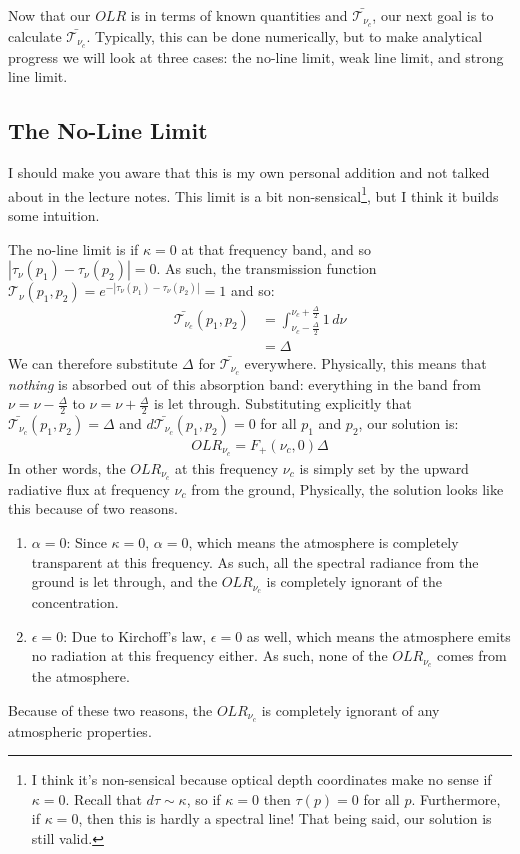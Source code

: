 Now that our $OLR$ is in terms of known quantities and $\bar{\mathcal{T}_{\nu_c}}$, our next goal is to calculate $\bar{\mathcal{T}_{\nu_c}}$. Typically, this can be done numerically, but to make analytical progress we will look at three cases: the no-line limit, weak line limit, and strong line limit.

\subsection{The No-Line Limit}
I should make you aware that this is my own personal addition and not talked about in the lecture notes. This limit is a bit non-sensical\footnote{
    I think it's non-sensical because optical depth coordinates make no sense if $\kappa=0$. Recall that $d\tau\sim \kappa$, so if $\kappa=0$ then $\tau(p)=0$ for all $p$. Furthermore, if $\kappa=0$, then this is hardly a spectral line! That being said, our solution is still valid.
}, but I think it builds some intuition.

The no-line limit is if $\kappa=0$ at that frequency band, and so $|\tau_\nu(p_1)-\tau_\nu(p_2)|=0$. As such, the transmission function $\mathcal{T}_{\nu}(p_1,p_2)=e^{-|\tau_\nu(p_1)-\tau_\nu(p_2)|}=1$ and so:
\begin{align*}
    \bar{\mathcal{T}_{\nu_c}}(p_1,p_2)&=\int_{\nu_c-\frac{\Delta}{2}}^{\nu_c+\frac{\Delta}{2}} 1 \,d\nu\\
    &=\Delta
\end{align*}
We can therefore substitute $\Delta$ for $\bar{\mathcal{T}_{\nu_c}}$ everywhere. Physically, this means that \textit{nothing} is absorbed out of this absorption band: everything in the band from $\nu=\nu-\frac{\Delta}{2}$ to $\nu=\nu+\frac{\Delta}{2}$ is let through. Substituting explicitly that $\bar{\mathcal{T}_{\nu_c}}(p_1,p_2)=\Delta$ and $d\bar{\mathcal{T}_{\nu_c}}(p_1,p_2)=0$ for all $p_1$ and $p_2$, our solution is:
\begin{align*}
    OLR_{\nu_c}=F_+(\nu_c,0)\Delta
\end{align*}
In other words, the $OLR_{\nu_c}$ at this frequency $\nu_c$ is simply set by the upward radiative flux at frequency $\nu_c$ from the ground, Physically, the solution looks like this because of two reasons.
\begin{enumerate}
    \item $\alpha=0$: Since $\kappa=0$, $\alpha=0$, which means the atmosphere is completely transparent at this frequency. As such, all the spectral radiance from the ground is let through, and the $OLR_{\nu_c}$ is completely ignorant of the concentration.
    \item $\epsilon=0$: Due to Kirchoff's law, $\epsilon=0$ as well, which means the atmosphere emits no radiation at this frequency either. As such, none of the $OLR_{\nu_c}$ comes from the atmosphere.
\end{enumerate}
Because of these two reasons, the $OLR_{\nu_c}$ is completely ignorant of any atmospheric properties.


